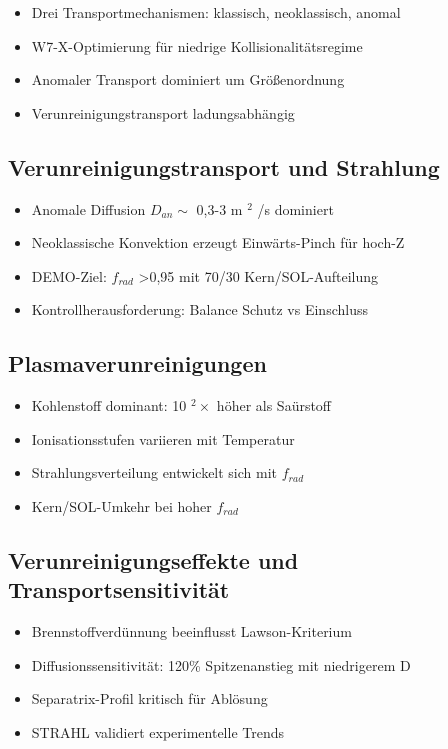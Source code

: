 \documentclass[11pt,a4paper]{article}
\begin{document}
\begin{itemize}
\item Drei Transportmechanismen: klassisch, neoklassisch, anomal
\item W7-X-Optimierung für niedrige Kollisionalitätsregime
\item Anomaler Transport dominiert um Größenordnung
\item Verunreinigungstransport ladungsabhängig
\end{itemize}

\subsection{Verunreinigungstransport und Strahlung}

\begin{itemize}
\item Anomale Diffusion $ D_{an}\sim $ 0,3-3 m $ ^2 $ /s dominiert
\item Neoklassische Konvektion erzeugt Einwärts-Pinch für hoch-Z
\item DEMO-Ziel: $ f_{rad} $ >0,95 mit 70/30 Kern/SOL-Aufteilung
\item Kontrollherausforderung: Balance Schutz vs Einschluss
\end{itemize}

\subsection{Plasmaverunreinigungen}

\begin{itemize}
\item Kohlenstoff dominant: 10 $ ^2 \times $ höher als Saürstoff
\item Ionisationsstufen variieren mit Temperatur
\item Strahlungsverteilung entwickelt sich mit $ f_{rad} $
\item Kern/SOL-Umkehr bei hoher $ f_{rad} $
\end{itemize}

\subsection{Verunreinigungseffekte und Transportsensitivität}

\begin{itemize}
\item Brennstoffverdünnung beeinflusst Lawson-Kriterium
\item Diffusionssensitivität: 120\% Spitzenanstieg mit niedrigerem D
\item Separatrix-Profil kritisch für Ablösung
\item STRAHL validiert experimentelle Trends
\end{itemize}
\end{document}
